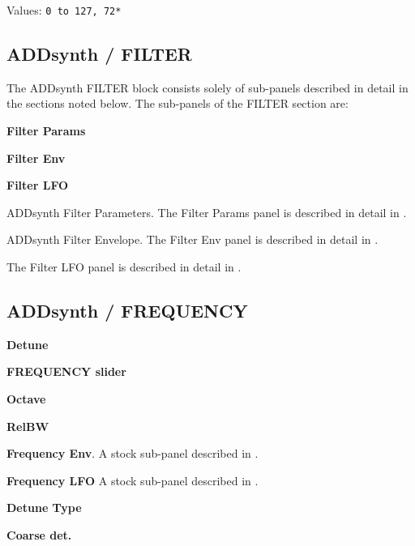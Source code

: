    Values: \texttt{0 to 127, 72*}

\subsection{ADDsynth / FILTER}
\label{subsec:addsynth_filter}

   The ADDsynth FILTER block consists solely of sub-panels
   described in detail in the sections noted below.  The
   sub-panels of the FILTER section are:

   \begin{enumber}
      \item \textbf{Filter Params}
      \item \textbf{Filter Env}
      \item \textbf{Filter LFO}
   \end{enumber}

   \setcounter{ItemCounter}{0}      %

   ADDsynth Filter Parameters.
   The Filter Params panel is described in detail in
   .

   ADDsynth Filter Envelope.
   The Filter Env panel is described in detail in
   .

   The Filter LFO panel is described in detail in
   .

\subsection{ADDsynth / FREQUENCY}
\label{subsec:addsynth_frequency}

   \begin{enumber}
      \item \textbf{Detune}
      \item \textbf{FREQUENCY slider}
      \item \textbf{Octave}
      \item \textbf{RelBW}
      \item \textbf{Frequency Env}.
         A stock sub-panel described in
         .
      \item \textbf{Frequency LFO}
         A stock sub-panel described in
         .
      \item \textbf{Detune Type}
      \item \textbf{Coarse det.}
   \end{enumber}

